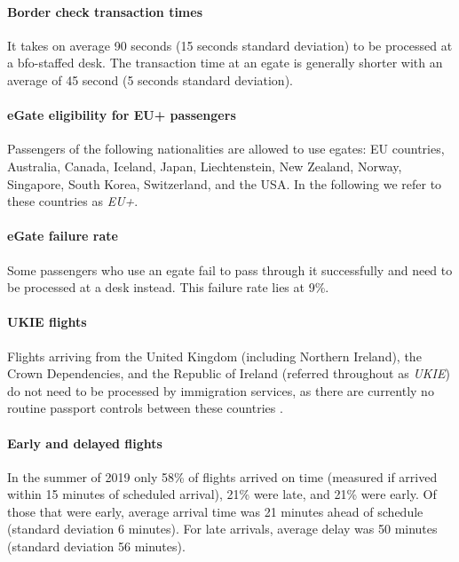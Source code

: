\documentclass[10pt]{article}
\begin{document}
\paragraph{Border check transaction times} It takes on average 90 seconds (15 seconds standard deviation) to be processed at a \gls{bfo}-staffed desk. The transaction time at an \gls{egate} is generally shorter with an average of 45 second (5 seconds standard deviation). 

\paragraph{eGate eligibility for EU+ passengers}
Passengers of the following nationalities are allowed to use \glspl{egate}: EU countries, Australia, Canada, Iceland, Japan, Liechtenstein, New Zealand, Norway, Singapore, South Korea, Switzerland, and the USA. In the following we refer to these countries as \textit{EU+}. 

\paragraph{eGate failure rate}
Some passengers who use an \gls{egate} fail to pass through it successfully and need to be processed at a desk instead. This failure rate lies at 9\%.

\paragraph{UKIE flights} Flights arriving from the United Kingdom (including Northern Ireland), the Crown Dependencies, and the Republic of Ireland (referred throughout as \textit{UKIE}) do not need to be processed by immigration services, as there are currently no routine passport controls between these countries \cite{common_travel_area}.

\paragraph{Early and delayed flights}
In the summer of 2019 only 58\% of flights arrived on time (measured if arrived within 15 minutes of scheduled arrival), 21\% were late, and 21\% were early. Of those that were early, average arrival time was 21 minutes ahead of schedule (standard deviation 6 minutes). For late arrivals, average delay was 50 minutes (standard deviation 56 minutes).
\end{document}

